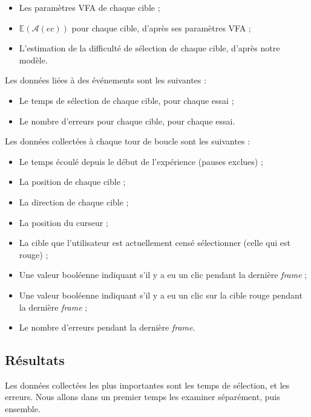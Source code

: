 	\begin{itemize}
		\item Les paramètres VFA de chaque cible ;
		\item $\mathbb{E}(\mathcal{A}(ec))$ pour chaque cible, d'après ses paramètres VFA ;
		\item L'estimation de la difficulté de sélection de chaque cible, d'après notre modèle.
	\end{itemize}
	
	Les données liées à des événements sont les suivantes :
	
	\begin{itemize}
		\item Le temps de sélection de chaque cible, pour chaque essai ;
		\item Le nombre d'erreurs pour chaque cible, pour chaque essai.
	\end{itemize}
	
	Les données collectées à chaque tour de boucle sont les suivantes :
	
	\begin{itemize}
		\item Le temps écoulé depuis le début de l'expérience (pauses exclues) ;
		\item La position de chaque cible  ;
		\item La direction de chaque cible ;
		\item La position du curseur ;
		\item La cible que l'utilisateur est actuellement censé sélectionner (celle qui est rouge) ;
		\item Une valeur booléenne indiquant s'il y a eu un clic pendant la dernière \emph{frame} ;
		\item Une valeur booléenne indiquant s'il y a eu un clic sur la cible rouge pendant la dernière \emph{frame} ;
		\item Le nombre d'erreurs pendant la dernière \emph{frame}.
	\end{itemize}
	
	\subsection{Résultats}
	\label{sub:as_res}
	Les données collectées les plus importantes sont les temps de sélection, et les erreurs. Nous allons dans un premier temps les examiner séparément, puis ensemble.
	
